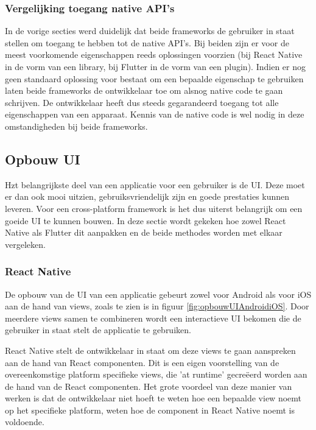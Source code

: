\subsubsection{Vergelijking toegang native API's}
\label{subsubsec:vglToegangNativeAPIs}

In de vorige secties werd duidelijk dat beide frameworks de gebruiker in staat stellen om toegang te hebben tot de native API's. Bij beiden zijn er voor de meest voorkomende eigenschappen reeds oplossingen voorzien (bij React Native in de vorm van een library, bij Flutter in de vorm van een plugin). Indien er nog geen standaard oplossing voor bestaat om een bepaalde eigenschap te gebruiken laten beide frameworks de ontwikkelaar toe om alsnog native code te gaan schrijven. De ontwikkelaar heeft dus steeds gegarandeerd toegang tot alle eigenschappen van een apparaat. Kennis van de native code is wel nodig in deze omstandigheden bij beide frameworks.


\subsection{Opbouw UI}
\label{subsec:opbouwUI}

Hzt belangrijkste deel van een applicatie voor een gebruiker is de UI. Deze moet er dan ook mooi uitzien, gebruiksvriendelijk zijn en goede prestaties kunnen leveren. Voor een cross-platform framework is het dus uiterst belangrijk om een goeide UI te kunnen bouwen. In deze sectie wordt gekeken hoe zowel React Native als Flutter dit aanpakken en de beide methodes worden met elkaar vergeleken.

\subsubsection{React Native}
\label{subsubsec:opbouwUIReactNative}

De opbouw van de UI van een applicatie gebeurt zowel voor Android als voor iOS aan de hand van views, zoals te zien is in figuur \ref{fig:opbouwUIAndroidiOS}. Door meerdere views samen te combineren wordt een interactieve UI bekomen die de gebruiker in staat stelt de applicatie te gebruiken. 



React Native stelt de ontwikkelaar in staat om deze views te gaan aanspreken aan de hand van React componenten. Dit is een eigen voorstelling van de overeenkomstige platform specifieke views, die 'at runtime' gecreëerd worden aan de hand van de React componenten. Het grote voordeel van deze manier van werken is dat de ontwikkelaar niet hoeft te weten hoe een bepaalde view noemt op het specifieke platform, weten hoe de component in React Native noemt is voldoende. 

